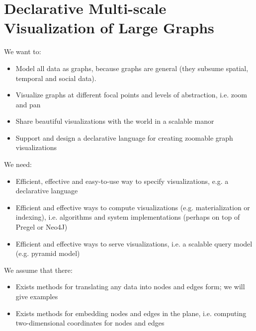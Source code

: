 \chapter{Declarative Multi-scale Visualization of Large Graphs}


We want to:
\begin{itemize}
\item Model all data as graphs, because graphs are general (they subsume spatial, temporal and social data). 
\item Visualize graphs at different focal points and levels of abstraction, i.e. zoom and pan
\item Share beautiful visualizations with the world in a scalable manor
\item Support and design a declarative language for creating zoomable graph visualizations
\end{itemize}

We need:
\begin{itemize}
\item Efficient, effective and easy-to-use way to specify visualizations, e.g. a declarative language
\item Efficient and effective ways to compute visualizations (e.g. materialization or indexing), i.e. algorithms and system implementations (perhaps on top of Pregel or Neo4J)
\item Efficient and effective ways to serve visualizations, i.e. a scalable query model (e.g. pyramid model)
\end{itemize}

We assume that there:

\begin{itemize}
\item Exists methods for translating any data into nodes and edges form; we will give examples
\item Exists methods for embedding nodes and edges in the plane, i.e. computing two-dimensional coordinates for nodes and edges
\end{itemize}

